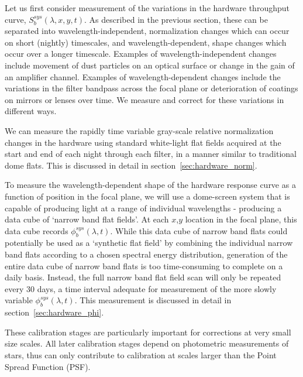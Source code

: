 \documentclass[12pt,preprint]{aastex}
\begin{document}
Let us first consider measurement of the variations in the hardware
throughput curve, $S_b^{sys}(\lambda,x,y,t)$. As described in the
previous section, these can be separated into wavelength-independent,
normalization changes which can occur on short (nightly) timescales,
and wavelength-dependent, shape changes which occur over a longer
timescale. Examples of wavelength-independent changes include movement
of dust particles on an optical surface or change in the gain of an
amplifier channel. Examples of wavelength-dependent changes include
the variations in the filter bandpass across the focal plane or
deterioration of coatings on mirrors or lenses over time. We measure
and correct for these variations in different ways.

We can measure the rapidly time variable gray-scale relative
normalization changes in the hardware using standard white-light flat
fields acquired at the start and end of each night through each
filter, in a manner similar to traditional dome flats. This is
discussed in detail in section~\ref{sec:hardware_norm}. 

To measure the wavelength-dependent shape of the hardware response
curve as a function of position in the focal plane, we will use a
dome-screen system that is capable of producing light at a range of
individual wavelengths - producing a data cube of `narrow band flat
fields'.  At each $x$,$y$ location in the focal plane, this data cube
records $\phi_b^{sys}(\lambda,t)$. While this data cube of narrow band
flats could potentially be used as a `synthetic flat field' by
combining the individual narrow band flats according to a chosen
spectral energy distribution, generation of the entire data cube of
narrow band flats is too time-consuming to complete on a daily
basis. Instead, the full narrow band flat field scan will only be
repeated every 30 days, a time interval adequate for measurement of
the more slowly variable $\phi_b^{sys}(\lambda,t)$. This measurement
is discussed in detail in section~\ref{sec:hardware_phi}.

These calibration stages are particularly important for corrections at
very small size scales.  All later calibration stages depend on
photometric measurements of stars, thus can only contribute to
calibration at scales larger than the Point Spread Function (PSF).
\end{document}
